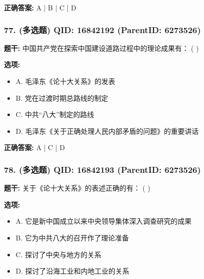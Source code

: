 \documentclass[12pt,UTF8]{ctexart}
\begin{document}
\textbf{正确答案:}
A | B | C | D

\vspace{0.3em}\hrulefill\vspace{0.7em}

\subsubsection*{77. (多选题) \small QID: 16842192 (ParentID: 6273526)}

\textbf{题干:}
中国共产党在探索中国建设道路过程中的理论成果有： ( )



\textbf{选项:}
\begin{itemize}[leftmargin=*]

  \item A. 毛泽东《论十大关系》的发表

  \item B. 党在过渡时期总路线的制定

  \item C. 中共“八大”制定的路线

  \item D. 毛泽东《关于正确处理人民内部矛盾的问题》的重要讲话

\end{itemize}

\textbf{正确答案:}
A | C | D

\vspace{0.3em}\hrulefill\vspace{0.7em}

\subsubsection*{78. (多选题) \small QID: 16842193 (ParentID: 6273526)}

\textbf{题干:}
关于《论十大关系》的表述正确的有： ( )



\textbf{选项:}
\begin{itemize}[leftmargin=*]

  \item A. 它是新中国成立以来中央领导集体深入调查研究的成果

  \item B. 它为中共八大的召开作了理论准备

  \item C. 探讨了中央与地方的关系

  \item D. 探讨了沿海工业和内地工业的关系

\end{itemize}
\end{document}
